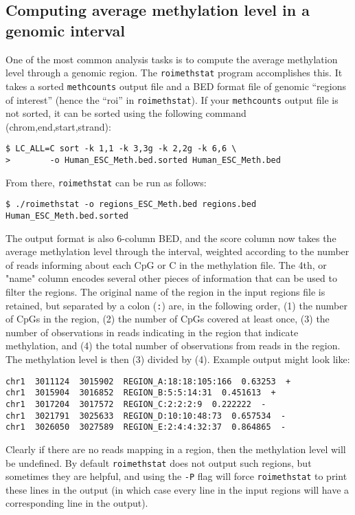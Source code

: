 \documentclass[10pt]{article}
\newcommand{\prog}[1]{\texttt{#1}}
\newcommand{\lit}[1]{\texttt{#1}}
\newcommand{\op}[1]{\texttt{#1}}
\begin{document}

\subsection{Computing average methylation level in a genomic interval}
\label{sec:roimethstat}

One of the most common analysis tasks is to compute the average
methylation level through a genomic region. The \prog{roimethstat}
program accomplishes this. It takes a sorted \prog{methcounts} output file
and a BED format file of genomic ``regions of interest'' (hence the
``roi'' in \prog{roimethstat}).  If your \prog{methcounts} output file is not
sorted, it can be sorted using the following command (chrom,end,start,strand):
\begin{verbatim}
$ LC_ALL=C sort -k 1,1 -k 3,3g -k 2,2g -k 6,6 \
>        -o Human_ESC_Meth.bed.sorted Human_ESC_Meth.bed
\end{verbatim}
From there, \prog{roimethstat} can be run as follows:
\begin{verbatim}
$ ./roimethstat -o regions_ESC_Meth.bed regions.bed Human_ESC_Meth.bed.sorted
\end{verbatim}
The output format is also 6-column BED, and the score column now takes
the average methylation level through the interval, weighted according
to the number of reads informing about each CpG or C in the
methylation file. The 4th, or "name" column encodes several other
pieces of information that can be used to filter the regions. The
original name of the region in the input regions file is retained, but
separated by a colon (\lit{:}) are, in the following order, (1) the
number of CpGs in the region, (2) the number of CpGs covered at least
once, (3) the number of observations in reads indicating in the region
that indicate methylation, and (4) the total number of observations
from reads in the region. The methylation level is then (3) divided by
(4). Example output might look like:
\begin{verbatim}
chr1  3011124  3015902  REGION_A:18:18:105:166  0.63253  +
chr1  3015904  3016852  REGION_B:5:5:14:31  0.451613  +
chr1  3017204  3017572  REGION_C:2:2:2:9  0.222222  -
chr1  3021791  3025633  REGION_D:10:10:48:73  0.657534  -
chr1  3026050  3027589  REGION_E:2:4:4:32:37  0.864865  -
\end{verbatim}
Clearly if there are no reads mapping in a region, then the
methylation level will be undefined. By default \prog{roimethstat}
does not output such regions, but sometimes they are helpful, and
using the \op{-P} flag will force \prog{roimethstat} to print these
lines in the output (in which case every line in the input regions
will have a corresponding line in the output).
\end{document}
